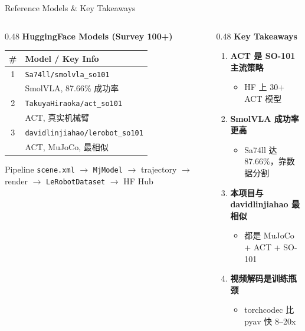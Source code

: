 \documentclass[aspectratio=169, 10pt, xcolor=dvipsnames]{beamer}
\begin{document}
\begin{frame}{Reference Models \& Key Takeaways}
\begin{columns}[T]
\begin{column}{0.48\textwidth}
\textbf{HuggingFace Models (Survey 100+)}

\vspace{0.2em}
\scriptsize
\begin{tabular}{cl}
\toprule
\textbf{\#} & \textbf{Model / Key Info} \\
\midrule
1 & \texttt{Sa74ll/smolvla\_so101} \\
  & SmolVLA, 87.66\% 成功率 \\
2 & \texttt{TakuyaHiraoka/act\_so101} \\
  & ACT, 真实机械臂 \\
3 & \texttt{davidlinjiahao/lerobot\_so101} \\
  & ACT, MuJoCo, 最相似 \\
\bottomrule
\end{tabular}

\vspace{0.3em}
\begin{exampleblock}{\scriptsize Pipeline}
\scriptsize
\texttt{scene.xml} $\to$ \texttt{MjModel} $\to$ trajectory $\to$ render $\to$ \texttt{LeRobotDataset} $\to$ HF Hub
\end{exampleblock}
\end{column}

\begin{column}{0.48\textwidth}
\textbf{Key Takeaways}

\vspace{0.2em}
\begin{enumerate}\setlength{\itemsep}{2pt}\scriptsize
  \item \textbf{ACT 是 SO-101 主流策略}
    \begin{itemize}\scriptsize
      \item HF 上 30+ ACT 模型
    \end{itemize}
  \item \textbf{SmolVLA 成功率更高}
    \begin{itemize}\scriptsize
      \item Sa74ll 达 87.66\%，靠数据分割
    \end{itemize}
  \item \textbf{本项目与 davidlinjiahao 最相似}
    \begin{itemize}\scriptsize
      \item 都是 MuJoCo + ACT + SO-101
    \end{itemize}
  \item \textbf{视频解码是训练瓶颈}
    \begin{itemize}\scriptsize
      \item torchcodec 比 pyav 快 8--20x
    \end{itemize}
\end{enumerate}
\end{column}
\end{columns}
\end{frame}
\end{document}
